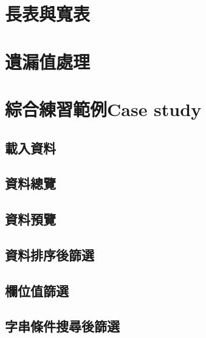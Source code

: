 \documentclass[
]{book}
\begin{document}
\hypertarget{reshape}{%
\section{長表與寬表}\label{reshape}}

\hypertarget{ux907aux6f0fux503cux8655ux7406}{%
\section{遺漏值處理}\label{ux907aux6f0fux503cux8655ux7406}}

\hypertarget{manCase}{%
\section{綜合練習範例Case study}\label{manCase}}

\hypertarget{ux8f09ux5165ux8cc7ux6599}{%
\subsection{載入資料}\label{ux8f09ux5165ux8cc7ux6599}}

\hypertarget{ux8cc7ux6599ux7e3dux89bd}{%
\subsection{資料總覽}\label{ux8cc7ux6599ux7e3dux89bd}}

\hypertarget{ux8cc7ux6599ux9810ux89bd}{%
\subsection{資料預覽}\label{ux8cc7ux6599ux9810ux89bd}}

\hypertarget{ux8cc7ux6599ux6392ux5e8fux5f8cux7be9ux9078}{%
\subsection{資料排序後篩選}\label{ux8cc7ux6599ux6392ux5e8fux5f8cux7be9ux9078}}

\hypertarget{ux6b04ux4f4dux503cux7be9ux9078}{%
\subsection{欄位值篩選}\label{ux6b04ux4f4dux503cux7be9ux9078}}

\hypertarget{ux5b57ux4e32ux689dux4ef6ux641cux5c0bux5f8cux7be9ux9078}{%
\subsection{字串條件搜尋後篩選}\label{ux5b57ux4e32ux689dux4ef6ux641cux5c0bux5f8cux7be9ux9078}}
\end{document}
